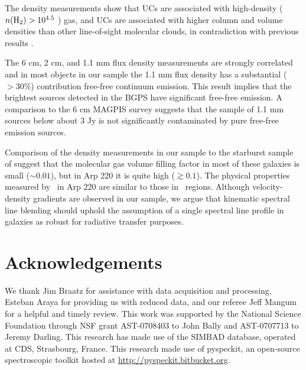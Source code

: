 The density measurements show that UCs are associated with
high-density ($n(\textrm{H}_{2})>10^{4.5}$ \percc) gas, and UCs are associated with
higher column and volume densities than other line-of-sight molecular clouds,
in contradiction with previous results \citep{Wadiak1988}.  

The 6 cm, 2 cm, and 1.1 mm flux density measurements are strongly correlated
and in most objects in our sample the 1.1 mm flux density has a substantial ($>30\%$) contribution 
free-free continuum emission.  This result implies that the
brightest sources detected in the BGPS have significant free-free emission.
A comparison to the 6 cm MAGPIS survey suggests that the sample of 1.1 mm
sources below about 3 Jy is not significantly contaminated by pure free-free
emission sources.  



Comparison of the density measurements in our sample to the starburst sample of
\citet{Mangum2008} suggest that the molecular gas volume filling factor in most of
these galaxies is small ($\sim 0.01$), but in Arp 220 it is quite high
($\gtrsim 0.1$).  The physical properties measured by \formaldehyde\ in Arp 220
are similar to those in \uchii\ regions.  Although velocity-density gradients
are observed in our sample, we argue that kinematic spectral line blending
should uphold the assumption of a single spectral line profile in galaxies as
robust for radiative transfer purposes.

\section{Acknowledgements}
We thank Jim Braatz for assistance with data acquisition and processing,
Esteban Araya for providing us with reduced data, and our referee Jeff Mangum
for a helpful and timely review.  This work was supported by the National
Science Foundation through NSF grant AST-0708403 to John Bally and AST-0707713
to Jeremy Darling.  This research has made use of the SIMBAD database, operated
at CDS, Strasbourg, France.  This research made use of pyspeckit, an
open-source spectroscopic toolkit hosted at \url{http://pyspeckit.bitbucket.org}.


